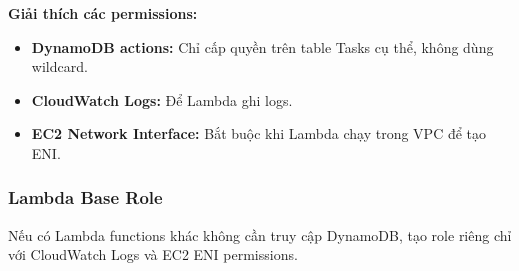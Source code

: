 \textbf{Giải thích các permissions:}
\begin{itemize}
    \item \textbf{DynamoDB actions:} Chỉ cấp quyền trên table Tasks cụ thể, không dùng wildcard.
    \item \textbf{CloudWatch Logs:} Để Lambda ghi logs.
    \item \textbf{EC2 Network Interface:} Bắt buộc khi Lambda chạy trong VPC để tạo ENI.
\end{itemize}

\subsubsection{Lambda Base Role}

Nếu có Lambda functions khác không cần truy cập DynamoDB, tạo role riêng chỉ với CloudWatch Logs và EC2 ENI permissions.
